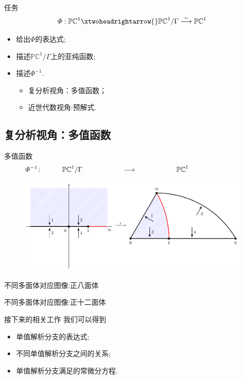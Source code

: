 \documentclass[pdf]{beamer}
\numberwithin{equation}{section}
\theoremstyle{plain}
\theoremstyle{plain}
\theoremstyle{remark}
\begin{document}
	\begin{frame}{任务}
$$\varPhi:\mathbb{PC}^1\xtwoheadrightarrow{}\mathbb{PC}^1/\Gamma\overset{\sim}{\longrightarrow}\mathbb{PC}^1$$
\begin{itemize}
	\item 给出$\varPhi$的表达式;
	\item 描述$\mathbb{PC}^1/\Gamma$上的亚纯函数;
	\item 描述$\varPhi^{-1}$.
	\begin{itemize}
		\item\alert<1>{复分析视角：多值函数；}
		\item<0> 近世代数视角:预解式.
	\end{itemize}
\end{itemize}
\end{frame}
\subsection{复分析视角：多值函数}
	\begin{frame}{多值函数}
	$$\hspace{-2.5cm}\varPhi^{-1}\colon\hspace{1cm} \mathbb{PC}^1/\Gamma\hspace{2cm} \longrightarrow \hspace{2cm}\mathbb{PC}^1$$
	\begin{figure}[ht]
	\centering
	\includegraphics[width=.98\textwidth]{pic/halfspace4.pdf}
	\label{pic:Ctriangle}
\end{figure}
\end{frame}
	\begin{frame}{不同多面体对应图像:正八面体}
\end{frame}
	\begin{frame}{不同多面体对应图像:正十二面体}
\end{frame}
	\begin{frame}{接下来的相关工作}
我们可以得到
\begin{itemize}[<+->]
	\item 单值解析分支的表达式;
	\item 不同单值解析分支之间的关系;
	\item 单值解析分支满足的常微分方程.
\end{itemize}
\end{frame}
\end{document}
